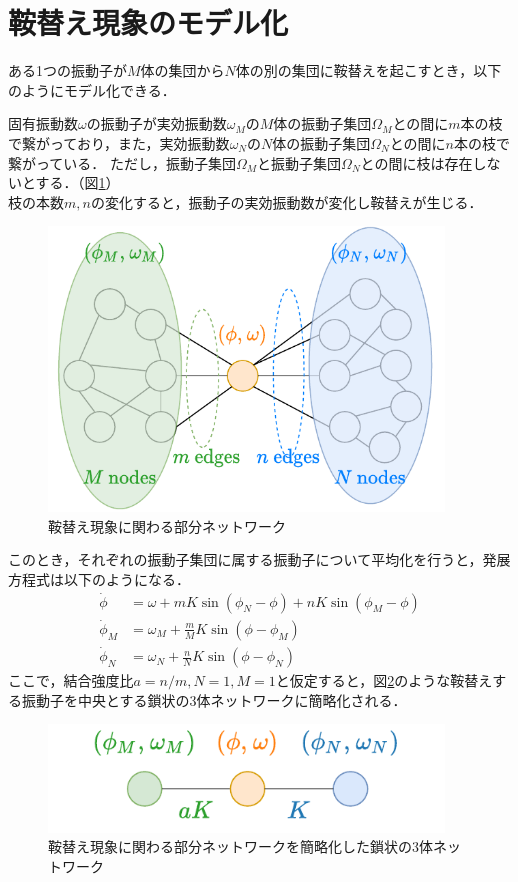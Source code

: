 \documentclass[../main]{subfiles}
\begin{document}
\section{鞍替え現象のモデル化}
ある1つの振動子が$M$体の集団から$N$体の別の集団に鞍替えを起こすとき，以下のようにモデル化できる．
\begin{screen}
固有振動数$\omega$の振動子が実効振動数$\omega_M$の$M$体の振動子集団$\Omega_M$との間に$m$本の枝で繋がっており，また，実効振動数$\omega_N$の$N$体の振動子集団$\Omega_N$との間に$n$本の枝で繋がっている．
ただし，振動子集団$\Omega_M$と振動子集団$\Omega_N$との間に枝は存在しないとする．（図\ref{fig:switch}）\\
枝の本数$m,n$の変化すると，振動子の実効振動数が変化し鞍替えが生じる．
\end{screen}
\begin{figure}[t]
\centering
\includegraphics[width=105mm]{./images/three_obj_before.pdf}
\centering
\caption{鞍替え現象に関わる部分ネットワーク}
\label{fig:switch}
\end{figure}
このとき，それぞれの振動子集団に属する振動子について平均化を行うと，発展方程式は以下のようになる．
\begin{align*}
    \dot{\phi}&=\omega+mK\sin\left( \phi_N-\phi \right)+nK\sin\left( \phi_M-\phi \right)\\
    \dot{\phi}_M&=\omega_M+\frac{m}{M}K\sin\left( \phi-\phi_M \right) \\
    \dot{\phi}_N&=\omega_N+\frac{n}{N}K\sin\left( \phi-\phi_N \right)    
\end{align*}
ここで，結合強度比$a=n/m,N=1,M=1$と仮定すると，図\ref{fig:3body}のような鞍替えする振動子を中央とする鎖状の3体ネットワークに簡略化される．
\begin{figure}[t]
\centering
\includegraphics[width=105mm]{./images/three_obj_after.pdf}
\centering
\caption{鞍替え現象に関わる部分ネットワークを簡略化した鎖状の3体ネットワーク}
\label{fig:3body}
\end{figure}
\end{document}
